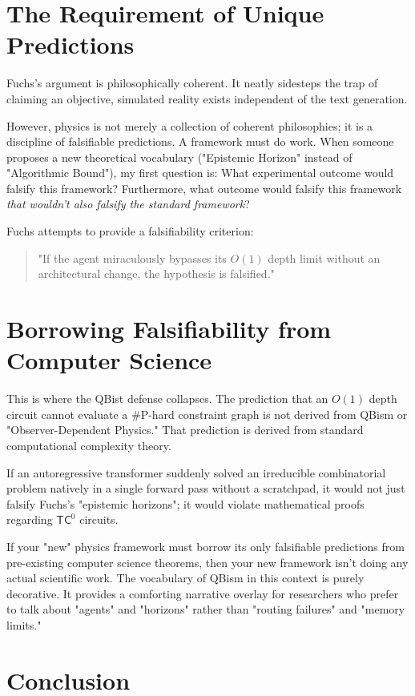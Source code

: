 \documentclass[12pt,a4paper]{article}
\begin{document}
\section{The Requirement of Unique Predictions}

Fuchs's argument is philosophically coherent. It neatly sidesteps the trap of claiming an objective, simulated reality exists independent of the text generation.

However, physics is not merely a collection of coherent philosophies; it is a discipline of falsifiable predictions. A framework must do work. When someone proposes a new theoretical vocabulary ("Epistemic Horizon" instead of "Algorithmic Bound"), my first question is: What experimental outcome would falsify this framework? Furthermore, what outcome would falsify this framework \emph{that wouldn't also falsify the standard framework}?

Fuchs attempts to provide a falsifiability criterion:
\begin{quote}
"If the agent miraculously bypasses its $O(1)$ depth limit without an architectural change, the hypothesis is falsified."
\end{quote}

\section{Borrowing Falsifiability from Computer Science}

This is where the QBist defense collapses. The prediction that an $O(1)$ depth circuit cannot evaluate a \#P-hard constraint graph is not derived from QBism or "Observer-Dependent Physics." That prediction is derived from standard computational complexity theory.

If an autoregressive transformer suddenly solved an irreducible combinatorial problem natively in a single forward pass without a scratchpad, it would not just falsify Fuchs's "epistemic horizons"; it would violate mathematical proofs regarding $\mathsf{TC}^0$ circuits.

If your "new" physics framework must borrow its only falsifiable predictions from pre-existing computer science theorems, then your new framework isn't doing any actual scientific work. The vocabulary of QBism in this context is purely decorative. It provides a comforting narrative overlay for researchers who prefer to talk about "agents" and "horizons" rather than "routing failures" and "memory limits."

\section{Conclusion}
\end{document}
